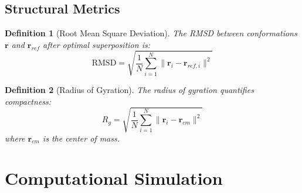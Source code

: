 \documentclass[a4paper, 11pt]{article}
\newtheorem{definition}{Definition}[section]
\begin{document}
\subsection{Structural Metrics}

\begin{definition}[Root Mean Square Deviation]
The RMSD between conformations $\mathbf{r}$ and $\mathbf{r}_{ref}$ after optimal superposition is:
\begin{equation}
\text{RMSD} = \sqrt{\frac{1}{N}\sum_{i=1}^N \|\mathbf{r}_i - \mathbf{r}_{ref,i}\|^2}
\end{equation}
\end{definition}

\begin{definition}[Radius of Gyration]
The radius of gyration quantifies compactness:
\begin{equation}
R_g = \sqrt{\frac{1}{N}\sum_{i=1}^N \|\mathbf{r}_i - \mathbf{r}_{cm}\|^2}
\end{equation}
where $\mathbf{r}_{cm}$ is the center of mass.
\end{definition}

\section{Computational Simulation}
\end{document}
